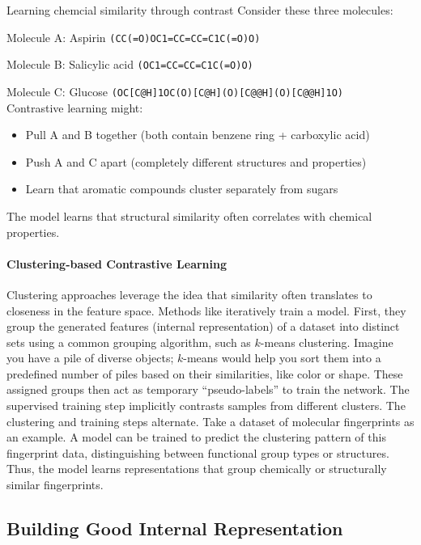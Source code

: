 \begin{examplebox}[label={example:contrastive}]{Learning chemcial similarity through contrast}
Consider these three molecules:

Molecule A: Aspirin \texttt{(CC(=O)OC1=CC=CC=C1C(=O)O)}

Molecule B: Salicylic acid \texttt{(OC1=CC=CC=C1C(=O)O)} 

Molecule C: Glucose \texttt{(OC[C@H]1OC(O)[C@H](O)[C@@H](O)[C@@H]1O)} \\

Contrastive learning might:
\begin{itemize}
    \item Pull A and B together (both contain benzene ring + carboxylic acid)
    \item Push A and C apart (completely different structures and properties)
    \item Learn that aromatic compounds cluster separately from sugars
\end{itemize}
The model learns that structural similarity often correlates with chemical properties.
\end{examplebox}

\paragraph{Clustering-based Contrastive Learning} 
\label{sec:clustering_cl}
Clustering approaches leverage the idea that similarity often translates to closeness in the feature space. Methods like  \autocite{caron2018deep}  iteratively train a model. 
First, they group the generated features (internal representation) of a dataset into distinct sets using a common grouping algorithm, such as $k$-means clustering. Imagine you have a pile of diverse objects; $k$-means would help you sort them into a predefined number of piles based on their similarities, like color or shape. 
These assigned groups then act as temporary \enquote{pseudo-labels} to train the network. 
The supervised training step implicitly contrasts samples from different clusters. The clustering and training steps alternate. 
Take a dataset of molecular fingerprints as an example. A model can be trained to predict the clustering pattern of this fingerprint data, distinguishing between functional group types or structures. Thus, the model learns representations that group chemically or structurally similar fingerprints. 



\subsection{Building Good Internal Representation} 

